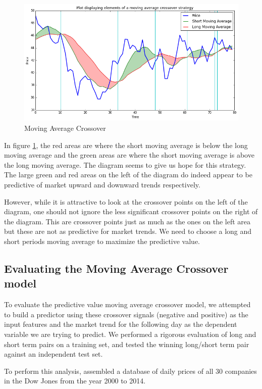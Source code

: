 \documentclass{report}
\begin{document}
\begin{figure}[H]
	\caption{Moving Average Crossover}
	\centerline{\includegraphics[width=\textwidth]{vis/macrossover.png}}
	\label{fig:macrossover}
\end{figure}

In figure \ref{fig:macrossover}, the red areas are where the short moving average is below the long moving average and the green areas are where the short moving average is above the long moving average. The diagram seems to give us hope for this strategy. The large green and red areas on the left of the diagram do indeed appear to be predictive of market upward and downward trends respectively. 

However, while it is attractive to look at the crossover points on the left of the diagram, one should not ignore the less significant crossover points on the right of the diagram. This are crossover points just as much as the ones on the left area but these are not as predictive for market trends. We need to choose a long and short periods moving average to maximize the predictive value.

\subsection{Evaluating the Moving Average Crossover model}

To evaluate the predictive value moving average crossover model, we attempted to build a predictor using these crossover signals (negative and positive) as the input features and the market trend for the following day as the dependent variable we are trying to predict. We performed a rigorous evaluation of long and short term pairs on a training set, and tested the winning long/short term pair against an independent test set.

To perform this analysis, assembled a database of daily prices of all 30 companies in the Dow Jones from the year 2000 to 2014.
\end{document}
